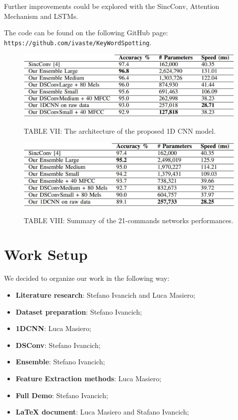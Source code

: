 \documentclass[conference]{IEEEtran}
\begin{document}
Further improvements could be explored with the SincConv, Attention Mechanism and LSTMs.

The code can be found on the following GitHub page: \texttt{https://github.com/ivaste/KeyWordSpotting}.

\begin{figure}
\centering
\includegraphics[scale=0.3]{tab1}
\begin{center}
TABLE VII: The architecture of the proposed 1D CNN model.
\end{center}
\end{figure}

\begin{figure}
\centering
\includegraphics[scale=0.3]{tab2}
\begin{center}
TABLE VIII: Summary of the 21-commands networks performances.
\end{center}
\end{figure}

\newpage
\section*{Work Setup}
We decided to organize our work in the following way:
\begin{itemize}
\item \textbf{Literature research}: Stefano Ivancich and Luca Masiero;
\item \textbf{Dataset preparation}: Stefano Ivancich;
\item \textbf{1DCNN}: Luca Masiero;
\item \textbf{DSConv}: Stefano Ivancich;
\item \textbf{Ensemble}: Stefano Ivancich;
\item \textbf{Feature Extraction methods}: Luca Masiero;
\item \textbf{Full Demo}: Stefano Ivancich;
\item \textbf{\LaTeX\xspace document}: Luca Masiero and Stafano Ivancich;
\end{itemize}
\end{document}
